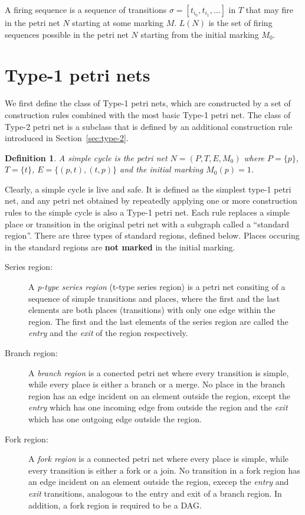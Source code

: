 \documentclass[12pt,a4paper]{article}
\newtheorem{definition}{Definition}
\begin{document}
A firing sequence is a sequence of transitions $\sigma = [t_{i_0},
t_{i_1}, \ldots]$ in $T$ that may fire in the petri net $N$ starting
at some marking $M$. $L(N)$ is the set of firing sequences possible in
the petri net $N$ starting from the initial marking $M_0$.

\section{Type-1 petri nets}
\label{sec:type-1}

We first define the class of Type-1 petri nets, which are constructed
by a set of construction rules combined with the most basic Type-1
petri net. The class of Type-2 petri net is a subclass that is defined
by an additional construction rule introduced in
Section~\ref{sec:type-2}.

\begin{definition}
  A \emph{simple cycle} is the petri net $N = (P, T, E, M_0)$ where $P
  = \{p\}$, $T =\{t\}$, $E = \{(p,t), (t,p)\}$ and the
  initial marking $M_0(p) = 1$.
\end{definition}

Clearly, a simple cycle is live and safe. It is defined as the
simplest type-1 petri net, and any petri net obtained by repeatedly
applying one or more construction rules to the simple cycle is also a
Type-1 petri net. Each rule replaces a simple place or transition in
the original petri net with a subgraph called a ``standard region''.
There are three types of standard regions, defined below. Places
occuring in the standard regions are \textbf{not marked} in the
initial marking.

\begin{description}
\item [Series region:] A \emph{p-type series region} (t-type series
  region) is a petri net consiting of a sequence of simple transitions
  and places, where the first and the last elements are both places
  (transitions) with only one edge within the region. The first and
  the last elements of the series region are called the \emph{entry}
  and the \emph{exit} of the region respectively.

\item [Branch region:] A \emph{branch region} is a conected petri net
  where every transition is simple, while every place is either a
  branch or a merge. No place in the branch region has an edge
  incident on an element outside the region, except the \emph{entry}
  which has one incoming edge from outside the region and the
  \emph{exit} which has one outgoing edge outside the region.

\item [Fork region:] A \emph{fork region} is a connected petri net
  where every place is simple, while every transition is either a fork
  or a join. No transition in a fork region has an edge incident on an
  element outside the region, execep the \emph{entry} and \emph{exit}
  transitions, analogous to the entry and exit of a branch region. In
  addition, a fork region is required to be a DAG.
\end{description}
\end{document}
